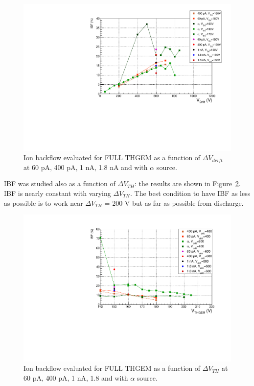 \documentclass[a4paper, 11 pt]{report}
\newcommand{\Vthgem}{$\Delta V_{TH}$}
\newcommand{\Vdrift}{$ \Delta V_{drift}$}
\begin{document}
\begin{figure}[htbp]
	\centering
	\includegraphics[width=\textwidth]{Immagini/IBFvsDrift_beam_alpha_average.pdf}
	\caption{Ion backflow evaluated for FULL THGEM as a function of \Vdrift{} at 60 pA, 400 pA, 1 nA, 1.8 nA and with $\alpha$ source.}
	\label{fig:IBFvsDrift_beam_alpha_average}
\end{figure}

IBF was studied also as a function of \Vthgem: the results are shown in 
Figure~\ref{fig:IBFvsTHGEM_beam_alpha}. IBF is nearly constant with varying \Vthgem. The best 
condition to have IBF as less as possible is to work near \Vthgem{} = 200 V but as far as possible 
from discharge.\\

\begin{figure}[!p]
	\centering
    \includegraphics[width=1.\textwidth]{Immagini/IBFvsTHGEM_beam_alpha_zoom.pdf}
	\caption{Ion backflow evaluated for FULL THGEM as a function of \Vthgem{} at 60 pA, 400 pA, 1 nA, 
	1.8 and with $\alpha$ source.}
	\label{fig:IBFvsTHGEM_beam_alpha}
\end{figure}
\end{document}
